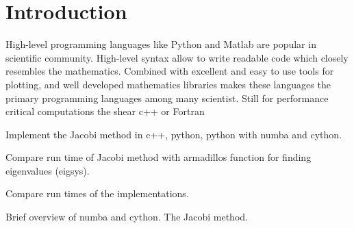 \section*{Introduction}

High-level programming languages like Python and Matlab are popular in
scientific community. High-level syntax allow to write readable code which
closely resembles the mathematics. Combined with excellent and easy to use tools
for plotting, and well developed mathematics libraries makes these languages the
primary programming languages among many scientist. Still for performance
critical computations the shear  c++ or Fortran  

Implement the Jacobi method in c++, python, python with numba and cython.

Compare run time of Jacobi method with armadillos function for finding eigenvalues (eigsys).

Compare run times of the implementations.

Brief overview of numba and cython. The Jacobi method.
